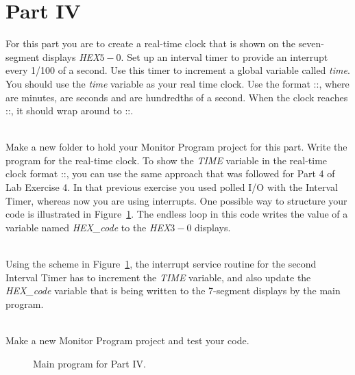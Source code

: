 \documentclass[epsfig,10pt,fullpage]{article}
\newcommand{\CommonDocsPath}{../../../../common/docs}
\begin{document}
\section*{ Part IV}
For this part you are to create a real-time clock that is shown on the seven-segment displays {\it HEX}$5-0$.
Set up an interval timer to provide an interrupt every 1/100 of a second. Use this
timer to increment a global variable called {\it time}. You should use the {\it time} variable as your real time clock.
Use the format ::, where  are minutes,  are seconds and  are hundredths of a second.
When the clock reaches ::, it should wrap around to ::.

~\\
Make a new folder to hold your Monitor Program project for this part. Write the program for the
real-time clock. To show the {\it TIME} variable in the real-time clock format
::, you can use the same approach that was followed for Part 4 of Lab Exercise 4.
In that previous exercise you used polled I/O with the Interval Timer,
whereas now you are using interrupts. One possible way to structure your code is illustrated in
Figure~\ref{fig:code3}. The endless loop in this code writes the value of a variable named
{\it HEX\_code} to the {\it HEX}$3-0$ displays.

~\\
Using the scheme in Figure~\ref{fig:code3}, the interrupt service routine for the second 
Interval Timer has to increment the {\it TIME} variable, and also update
the {\it HEX\_code} variable that is being written to the 7-segment displays by the main program.

~\\
Make a new Monitor Program project and test your code. 

\begin{figure}[H]
\begin{center}

\end{center}
\vspace{-0.5cm}\caption{Main program for Part IV.}
\label{fig:code3}
\end{figure}




\end{document}
